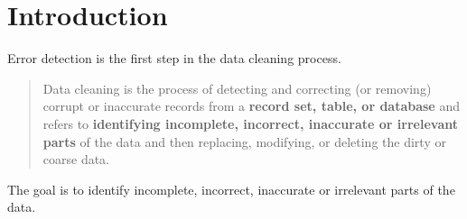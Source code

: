 \chapter{Introduction}

Error detection is the first step in the data cleaning process.

\blockquote{Data cleaning is the process of detecting and correcting (or removing) corrupt or inaccurate records from a \textbf{record set, table, or database} and refers to \textbf{identifying incomplete, incorrect, inaccurate or irrelevant parts} of the data and then replacing, modifying, or deleting the dirty or coarse data.}

The goal is to identify incomplete, incorrect, inaccurate or irrelevant parts of the data.




